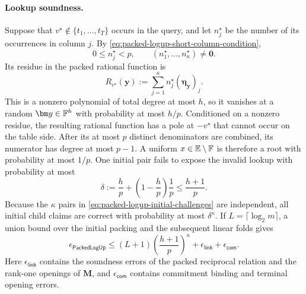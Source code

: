 \documentclass[runningheads]{llncs}
\begin{document}
\paragraph{Lookup soundness.}
Suppose that
\(v^\star\notin\{t_1,\ldots,t_T\}\) occurs in the query, and let
\(n_j^\star\) be the number of its occurrences in column \(j\).  By
\eqref{eq:packed-logup-short-column-condition},
\[
    0\leq n_j^\star<p,
    \qquad
    (n_1^\star,\ldots,n_\kappa^\star)\ne\bm0.
\]
Its residue in the packed rational function is
\begin{equation}
    R_{v^\star}(\bm y)
      :=\sum_{j=1}^{\kappa}
        n_j^\star(\bm\eta_{\bm y})_j.
\label{eq:packed-logup-invalid-residue}
\end{equation}
This is a nonzero polynomial of total degree at most \(h\), so it
vanishes at a random \(\bm y\in\Field^h\) with probability at most
\(h/p\).  Conditioned on a nonzero residue, the resulting rational
function has a pole at \(-v^\star\) that cannot occur on the table side.
After its at most \(p\) distinct denominators are combined, its
numerator has degree at most \(p-1\).  A uniform
\(x\in\mathbb E\setminus{\mathbb{F}}\) is therefore a root with probability
at most \(1/p\).  One initial pair fails to expose the invalid lookup
with probability at most
\[
    \delta
      :=\frac hp+\left(1-\frac hp\right)\frac1p
      \leq\frac{h+1}{p}.
\]
Because the \(\kappa\) pairs in
\eqref{eq:packed-logup-initial-challenges} are independent, all initial
child claims are correct with probability at most \(\delta^\kappa\).
If \(L=\lceil\log_2m\rceil\), a union bound over the initial packing and
the subsequent linear folds gives
\begin{equation}
\boxed{
    \epsilon_{\mathsf{PackedLogUp}}
      \leq
      (L+1)
      \left(\frac{h+1}{p}\right)^\kappa
      +\epsilon_{\mathsf{link}}
      +\epsilon_{\mathsf{com}}.}
\label{eq:packed-logup-soundness}
\end{equation}
Here \(\epsilon_{\mathsf{link}}\) contains the soundness errors of the
packed reciprocal relation and the rank-one openings of \(\bm M\), and
\(\epsilon_{\mathsf{com}}\) contains commitment binding and terminal
opening errors.
\end{document}
